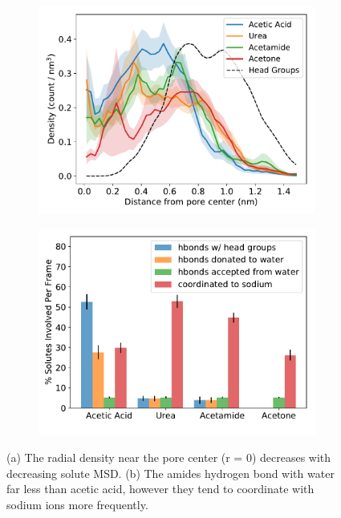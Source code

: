 \documentclass{article}
\begin{document}
  \begin{figure}[!htb]
  \centering
  \begin{subfigure}{0.45\textwidth}
  \includegraphics[width=\textwidth]{ketone_rdf.pdf}
  \caption{}\label{fig:ketones_rdf}
  \end{subfigure}
  \begin{subfigure}{0.45\textwidth}
  \includegraphics[width=\textwidth]{ketone_hbonds.pdf}
  \caption{}\label{fig:ketone_hbonds}
  \end{subfigure}
  \caption{(a) The radial density near the pore center (r = 0) decreases
  with decreasing solute MSD. (b) The amides hydrogen bond with water far
  less than acetic acid, however they tend to coordinate with sodium ions
  more frequently.}\label{fig:ketones}
  \end{figure}
  
\end{document}
